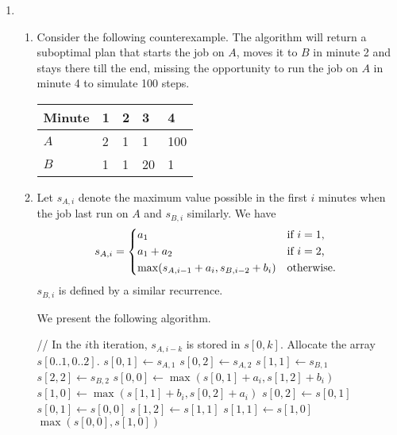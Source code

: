 \documentclass{article}
\begin{document}
\begin{enumerate}
    \item \begin{enumerate}
        \item Consider the following counterexample. The algorithm will return a suboptimal plan that starts the job on $A$, moves it to $B$ in minute 2 and stays there till the end, missing the opportunity to run the job on $A$ in minute 4 to simulate 100 steps.
        \begin{table}[ht]
            \centering
            \begin{tabular}{@{}lllll@{}}
                \toprule
                Minute & 1 & 2 & 3  & 4   \\ \midrule
                $A$    & 2 & 1 & 1  & 100 \\
                $B$    & 1 & 1 & 20 & 1   \\ \bottomrule
            \end{tabular}
        \end{table}
        \item Let $s_{A, i}$ denote the maximum value possible in the first $i$ minutes when the job last run on $A$ and $s_{B, i}$ similarly. We have
        \[
            s_{A, i} = \begin{dcases*}
                a_1 & if $i = 1$,\\
                a_1 + a_2 & if $i = 2$,\\
                \max(s_{A, i - 1} + a_i, s_{B, i - 2} + b_i) & otherwise.
            \end{dcases*}
        \]
        $s_{B, i}$ is defined by a similar recurrence.

        We present the following algorithm.
        \begin{algorithmic}[1]
            \State // In the $i$th iteration, $s_{A, i - k}$ is stored in $s[0, k]$.
            \State Allocate the array $s[0..1, 0..2]$.
            \State $s[0, 1] \gets s_{A, 1}$
            \State $s[0, 2] \gets s_{A, 2}$
            \State $s[1, 1] \gets s_{B, 1}$
            \State $s[2, 2] \gets s_{B, 2}$
                \State $s[0, 0] \gets \max(s[0, 1] + a_i, s[1, 2] + b_i)$
                \State $s[1, 0] \gets \max(s[1, 1] + b_i, s[0, 2] + a_i)$
                \State $s[0, 2] \gets s[0, 1]$
                \State $s[0, 1] \gets s[0, 0]$
                \State $s[1, 2] \gets s[1, 1]$
                \State $s[1, 1] \gets s[1, 0]$
            \EndFor
            \State \Return $\max(s[0, 0], s[1, 0])$
        \end{algorithmic}


\end{enumerate}
\end{enumerate}
\end{document}

